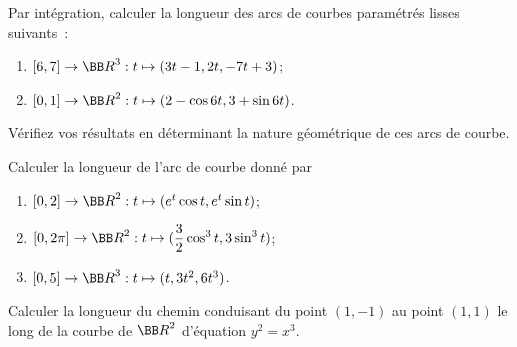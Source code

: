 \documentclass[12pt,french,oneside,a4paper]{memoir} %
\begin{document}
\begin{exo}
Par intégration, calculer la longueur des arcs de courbes paramétrés
lisses suivants~:
\begin{enumerate}
\item $[6,7] \rightarrow {\BB R}^3 : t \mapsto (3t-1,2t,-7t+3)$; 
\item $[0,1] \rightarrow {\BB R}^2 : t \mapsto (2-\cos 6t,3+ \sin 6t)$.
\end{enumerate}
Vérifiez vos résultats en déterminant la nature géométrique de ces arcs de
courbe.
\end{exo}
\begin{exo}
Calculer la longueur de l'arc de courbe donné par
\begin{enumerate}
\item $[0,2] \rightarrow {\BB R}^2 : t \mapsto (e^t \cos t, e^t \sin t)$; 
\item $[0,2 \pi] \rightarrow {\BB R}^2 : t \mapsto
(\displaystyle{\frac{3}{2} \cos^3 t, 3 \sin^3 t)}$;
\item $[0,5] \rightarrow {\BB R}^3 : t \mapsto (t,3t^2,6t^3)$.
\end{enumerate}
\end{exo}

\begin{exo}
Calculer la longueur du chemin conduisant du point $(1,-1)$ au point
$(1,1)$ le long de la courbe de ${\BB R}^2$ d'équation $y^2=x^3$. 


\end{exo}
\end{document}
